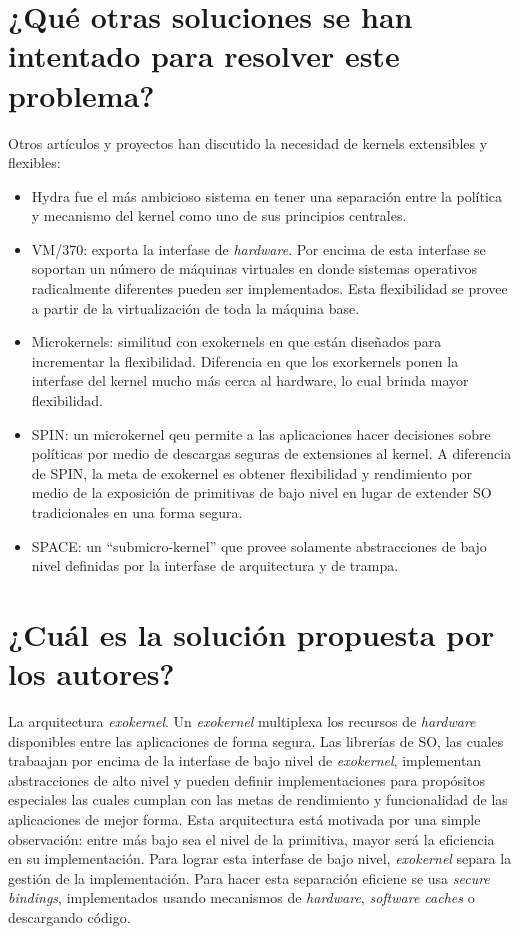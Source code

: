 \section{¿Qué otras soluciones se han intentado para resolver este problema?}
Otros artículos y proyectos han discutido la necesidad de kernels extensibles y flexibles:
\begin{itemize}
    \item Hydra fue el más ambicioso sistema en tener una separación entre la política y mecanismo del kernel como uno de sus principios centrales.
    \item VM/370: exporta la interfase de \textit{hardware}. Por encima de esta interfase se soportan un número de máquinas virtuales en donde sistemas operativos radicalmente diferentes pueden ser implementados. Esta flexibilidad se provee a partir de la virtualización de toda la máquina base.
    \item Microkernels: similitud con exokernels en que están diseñados para incrementar la flexibilidad. Diferencia en que los exorkernels ponen la interfase del kernel mucho más cerca al hardware, lo cual brinda mayor flexibilidad.
    \item SPIN: un microkernel qeu permite a las aplicaciones hacer decisiones sobre políticas por medio de descargas seguras de extensiones al kernel. A diferencia de SPIN, la meta de exokernel es obtener flexibilidad y rendimiento por medio de la exposición de primitivas de bajo nivel en lugar de extender SO tradicionales en una forma segura.
    \item SPACE: un ``submicro-kernel'' que provee solamente abstracciones de bajo nivel definidas por la interfase de arquitectura y de trampa. 
\end{itemize}

\section{¿Cuál es la solución propuesta por los autores?}
La arquitectura \textit{exokernel}. Un \textit{exokernel} multiplexa los recursos de \textit{hardware} disponibles entre las aplicaciones de forma segura. Las librerías de SO, las cuales trabaajan por encima de la interfase de bajo nivel de \textit{exokernel}, implementan abstracciones de alto nivel y pueden definir implementaciones para propósitos especiales las cuales cumplan con las metas de rendimiento y funcionalidad de las aplicaciones de mejor forma. Esta arquitectura está motivada por una simple observación: entre más bajo sea el nivel de la primitiva, mayor será la eficiencia en su implementación. Para lograr esta interfase de bajo nivel, \textit{exokernel} separa la gestión de la implementación. Para hacer esta separación eficiene se usa \textit{secure bindings}, implementados usando mecanismos de \textit{hardware}, \textit{software caches} o descargando código.

